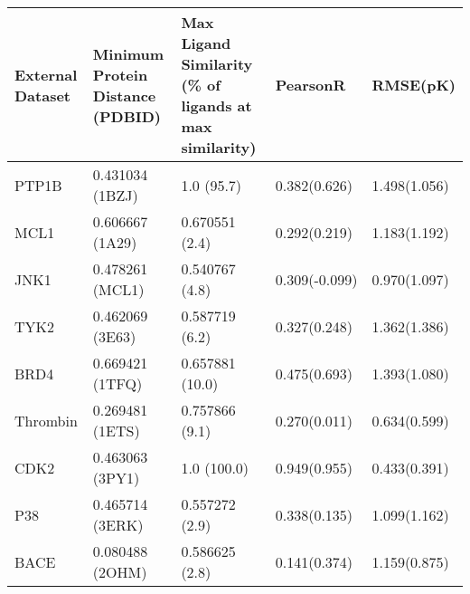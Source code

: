 \begin{tabular}{lllll}\n\toprule
External Dataset & Minimum Protein Distance (PDBID) & Max Ligand Similarity (\% of ligands at max similarity) & PearsonR & RMSE(pK) \\ 
 \midrule 
PTP1B & 0.431034 (1BZJ) & 1.0 (95.7) & 0.382(0.626) & 1.498(1.056)\\ 
MCL1 & 0.606667 (1A29) & 0.670551 (2.4) & 0.292(0.219) & 1.183(1.192)\\ 
JNK1 & 0.478261 (MCL1) & 0.540767 (4.8) & 0.309(-0.099) & 0.970(1.097)\\ 
TYK2 & 0.462069 (3E63) & 0.587719 (6.2) & 0.327(0.248) & 1.362(1.386)\\ 
BRD4 & 0.669421 (1TFQ) & 0.657881 (10.0) & 0.475(0.693) & 1.393(1.080)\\ 
Thrombin & 0.269481 (1ETS) & 0.757866 (9.1) & 0.270(0.011) & 0.634(0.599)\\ 
CDK2 & 0.463063 (3PY1) & 1.0 (100.0) & 0.949(0.955) & 0.433(0.391)\\ 
P38 & 0.465714 (3ERK) & 0.557272 (2.9) & 0.338(0.135) & 1.099(1.162)\\ 
BACE & 0.080488 (2OHM) & 0.586625 (2.8) & 0.141(0.374) & 1.159(0.875)\\ 
\bottomrule
\end{tabular}
